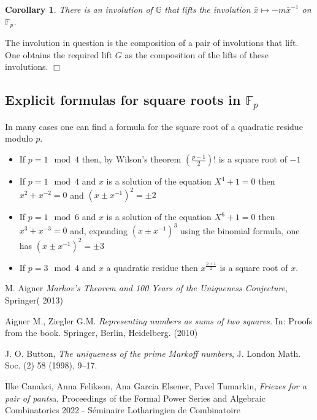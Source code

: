 \documentclass[12pt,a4paper]{amsart}
\newtheorem{coro}[thm]{Corollary}
\def\GG{\mathbb{G}}
\def\fp{\mathbb{F}_p}
\begin{document}
\begin{coro}
There is an involution of $\GG$ that lifts the involution 
$\bar{x} \mapsto -m\bar{x}^{-1}$ on $\fp$.
\end{coro}
\proof The involution in question is the composition of a pair of
involutions that lift. 
One obtains the required lift $G$ as the composition of the lifts of
these involutions. 
\hfill $\Box$

\subsection{Explicit formulas for square roots in $\fp$}

In many cases one can find a formula for the square root of a
quadratic residue modulo $p$.
\begin{itemize}
	\item If $p = 1 \mod 4$ then, by Wilson's theorem
		$\left(\frac{p-1}{2}\right)!$ is a square root of $-1$
	\item If $p = 1 \mod 4$ and $x$ is a solution of the
		equation
		$X^4+1 = 0$ then $x^2 + x^{-2}=0$
		and $(x\pm x^{-1})^2 = \pm 2$
	
	\item If $p = 1 \mod 6$ and $x$ is a solution of the
		equation
		$X^6+1 = 0$ then $x^3 + x^{-3}=0$
		and, expanding  $(x\pm x^{-1})^3$
		using the binomial formula, one has
		$(x\pm x^{-1})^2 = \pm 3$
	\item If $p = 3 \mod 4$ and $x$ a quadratic residue
		then $x^\frac{p+1}{2}$ is a square root of
		$x$.
		
\end{itemize}

M. Aigner
\textit{Markov's Theorem and 100 Years of the Uniqueness Conjecture}, Springer( 2013)

Aigner M., Ziegler G.M.  
\textit{Representing numbers as sums of two squares.} In: Proofs from the book. Springer, Berlin, Heidelberg. (2010)


J. O. Button, 
\textit{The uniqueness of the prime Markoff numbers},
 J. London Math. Soc.
(2) 58 (1998), 9–17.

Ilke Canakci, Anna Felikson, Ana Garcia Elsener, Pavel Tumarkin,
\textit{Friezes for a pair of pants}a,
Proceedings of the Formal Power Series and Algebraic Combinatorics 2022 - Séminaire Lotharingien de Combinatoire
\end{document}
